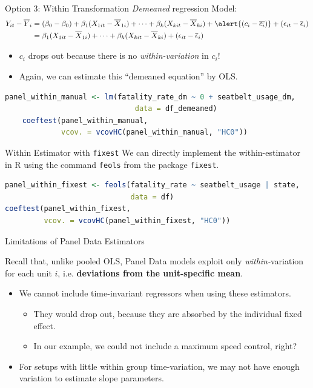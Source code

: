 \documentclass[11pt, aspectratio = 169]{beamer}
\begin{document}
\begin{frame}[fragile]{Option 3: Within Transformation}
\textit{Demeaned} regression Model:
\begin{align*}
Y_{it}-\overline{Y}_{i} 
&= (\beta_0 - \beta_0)
  + \beta_1(X_{1it}-\overline{X}_{1i})
  + \cdots
  + \beta_k(X_{kit}-\overline{X}_{ki})
  + \alert{(c_i - \overline{c_i})}
  + (\epsilon_{it}-\overline{\epsilon}_i) \\
&= \beta_1(X_{1it}-\overline{X}_{1i})
  + \cdots
  + \beta_k(X_{kit}-\overline{X}_{ki})
  + (\epsilon_{it}-\overline{\epsilon}_i)
\end{align*}
\vspace{-1cm}
\begin{itemize}
    \item \alert{$c_i$} drops out because there is no \textit{within-variation} in $c_i$!
    \item Again, we can estimate this “demeaned equation” by OLS.
\end{itemize}
\pause
\begin{lstlisting}[language=R]
    panel_within_manual <- lm(fatality_rate_dm ~ 0 + seatbelt_usage_dm, 
                              data = df_demeaned)
    coeftest(panel_within_manual, 
             vcov. = vcovHC(panel_within_manual, "HC0"))
\end{lstlisting}
\end{frame}

\begin{frame}[fragile]{Within Estimator with \texttt{fixest}}
We can directly implement the within-estimator in R using the command
\alert{\texttt{feols}} from the package \alert{\texttt{fixest}}.
\pause
\begin{lstlisting}[language=R]
panel_within_fixest <- feols(fatality_rate ~ seatbelt_usage | state, 
                             data = df)
coeftest(panel_within_fixest, 
         vcov. = vcovHC(panel_within_fixest, "HC0"))
\end{lstlisting}
\end{frame}

\begin{frame}{Limitations of Panel Data Estimators}

Recall that, unlike pooled OLS, Panel Data models exploit only \textit{within-}variation for each unit $i$, i.e. \textbf{deviations from the unit-specific mean}. \pause
\begin{itemize}
    \item \alert{We cannot include time-invariant regressors} when using these estimators. 
    \begin{itemize}
        \item They would drop out, because they are absorbed by the individual fixed effect.
        \item In our example, we could not include a maximum speed control, right?
    \end{itemize} \pause
    \item For setups with little within group time-variation, we may \alert{not have enough variation} to estimate slope parameters.
\end{itemize}
\end{frame}
\end{document}

